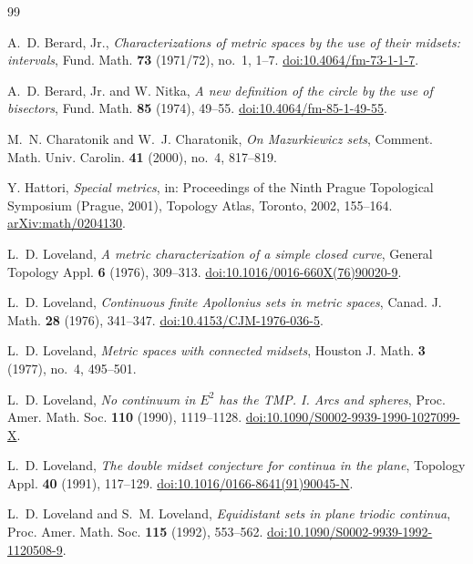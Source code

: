 \documentclass[11pt]{amsart}
\theoremstyle{definition}
\theoremstyle{remark}
\begin{document}
\begin{thebibliography}{99}

A.~D. Berard, Jr., \emph{Characterizations of metric spaces by the use of their midsets: intervals}, Fund. Math. \textbf{73} (1971/72), no.~1, 1--7. \href{https://doi.org/10.4064/fm-73-1-1-7}{doi:10.4064/fm-73-1-1-7}.

A.~D. Berard, Jr. and W. Nitka, \emph{A new definition of the circle by the use of bisectors}, Fund. Math. \textbf{85} (1974), 49--55. \href{https://doi.org/10.4064/fm-85-1-49-55}{doi:10.4064/fm-85-1-49-55}.

M.~N. Charatonik and W.~J. Charatonik, \emph{On Mazurkiewicz sets}, Comment. Math. Univ. Carolin. \textbf{41} (2000), no.~4, 817--819.

Y. Hattori, \emph{Special metrics}, in: Proceedings of the Ninth Prague Topological Symposium (Prague, 2001), Topology Atlas, Toronto, 2002, 155--164. \href{https://arxiv.org/abs/math/0204130}{arXiv:math/0204130}.

L.~D. Loveland, \emph{A metric characterization of a simple closed curve}, General Topology Appl. \textbf{6} (1976), 309--313. \href{https://doi.org/10.1016/0016-660X(76)90020-9}{doi:10.1016/0016-660X(76)90020-9}.

L.~D. Loveland, \emph{Continuous finite Apollonius sets in metric spaces}, Canad. J. Math. \textbf{28} (1976), 341--347. \href{https://doi.org/10.4153/CJM-1976-036-5}{doi:10.4153/CJM-1976-036-5}.

L.~D. Loveland, \emph{Metric spaces with connected midsets}, Houston J. Math. \textbf{3} (1977), no.~4, 495--501.

L.~D. Loveland, \emph{No continuum in $E^2$ has the TMP. I. Arcs and spheres}, Proc. Amer. Math. Soc. \textbf{110} (1990), 1119--1128. \href{https://doi.org/10.1090/S0002-9939-1990-1027099-X}{doi:10.1090/S0002-9939-1990-1027099-X}.

L.~D. Loveland, \emph{The double midset conjecture for continua in the plane}, Topology Appl. \textbf{40} (1991), 117--129. \href{https://doi.org/10.1016/0166-8641(91)90045-N}{doi:10.1016/0166-8641(91)90045-N}.

L.~D. Loveland and S.~M. Loveland, \emph{Equidistant sets in plane triodic continua}, Proc. Amer. Math. Soc. \textbf{115} (1992), 553--562. \href{https://doi.org/10.1090/S0002-9939-1992-1120508-9}{doi:10.1090/S0002-9939-1992-1120508-9}.


\end{thebibliography}
\end{document}
